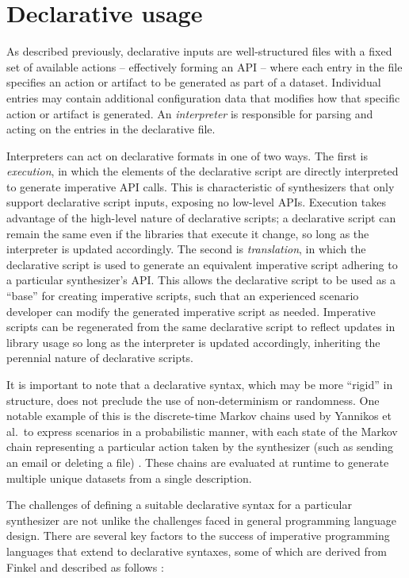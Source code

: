 \documentclass[letterpaper,12pt]{report}
\begin{document}
\section{Declarative usage}\label{declarative-usage}

As described previously, declarative inputs are well-structured files
with a fixed set of available actions -- effectively forming an API --
where each entry in the file specifies an action or artifact to be
generated as part of a dataset. Individual entries may contain
additional configuration data that modifies how that specific action or
artifact is generated. An \emph{interpreter} is responsible for parsing
and acting on the entries in the declarative file.

Interpreters can act on declarative formats in one of two ways. The
first is \emph{execution}, in which the elements of the declarative
script are directly interpreted to generate imperative API calls. This
is characteristic of synthesizers that only support declarative script
inputs, exposing no low-level APIs. Execution takes advantage of the
high-level nature of declarative scripts; a declarative script can
remain the same even if the libraries that execute it change, so long as
the interpreter is updated accordingly. The second is
\emph{translation}, in which the declarative script is used to generate
an equivalent imperative script adhering to a particular synthesizer's
API. This allows the declarative script to be used as a ``base'' for
creating imperative scripts, such that an experienced scenario developer
can modify the generated imperative script as needed. Imperative scripts
can be regenerated from the same declarative script to reflect updates
in library usage so long as the interpreter is updated accordingly,
inheriting the perennial nature of declarative scripts.

It is important to note that a declarative syntax, which may be more
``rigid'' in structure, does not preclude the use of non-determinism or
randomness. One notable example of this is the discrete-time Markov
chains used by Yannikos et al.~to express scenarios in a probabilistic
manner, with each state of the Markov chain representing a particular
action taken by the synthesizer (such as sending an email or deleting a
file) \cite{yannikosDataCorporaDigital2014}. These chains are
evaluated at runtime to generate multiple unique datasets from a single
description.

The challenges of defining a suitable declarative syntax for a
particular synthesizer are not unlike the challenges faced in general
programming language design. There are several key factors to the
success of imperative programming languages that extend to declarative
syntaxes, some of which are derived from Finkel and described as follows
\cite{finkel1996advanced}:
\end{document}
